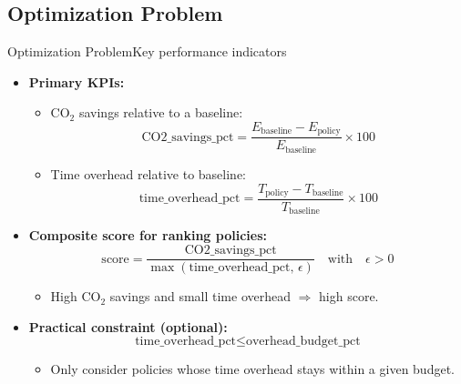 \subsection{Optimization Problem}

\begin{frame}[t]{Optimization Problem}{Key performance indicators}

  \begin{itemize}
    \item \textbf{Primary KPIs:}
      \begin{itemize}
        \item CO$_2$ savings relative to a baseline:
          \[
            \text{CO2\_savings\_pct}
            = \frac{E_{\text{baseline}} -
            E_{\text{policy}}}{E_{\text{baseline}}} \times 100
          \]
        \item Time overhead relative to baseline:
          \[
            \text{time\_overhead\_pct}
            = \frac{T_{\text{policy}} -
            T_{\text{baseline}}}{T_{\text{baseline}}} \times 100
          \]
      \end{itemize}

      \vspace{0.2cm}
    \item \textbf{Composite score for ranking policies:}
      \[
        \text{score} =
        \frac{\text{CO2\_savings\_pct}}
        {\max(\text{time\_overhead\_pct}, \,\epsilon)}
        \quad\text{with}\quad \epsilon > 0
      \]
      \begin{itemize}
        \item High CO$_2$ savings and small time overhead
          $\Rightarrow$ high score.
      \end{itemize}

      \vspace{0.2cm}
    \item \textbf{Practical constraint (optional):}
      \[
        \text{time\_overhead\_pct} \leq \text{overhead\_budget\_pct}
      \]
      \begin{itemize}
        \item Only consider policies whose time overhead stays within
          a given budget.
      \end{itemize}
  \end{itemize}

\end{frame}
